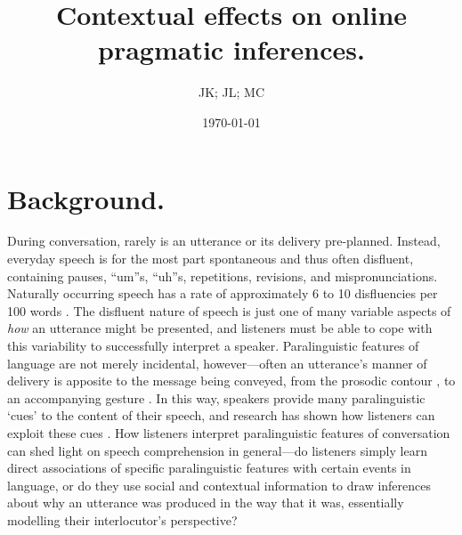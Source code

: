 \documentclass[man]{apa6}
\begin{document}
\title{Contextual effects on online pragmatic inferences.}
\author{JK; JL; MC}
\date{\today}
\maketitle

\section{Background.}
During conversation, rarely is an utterance or its delivery pre-planned.
Instead, everyday speech is for the most part spontaneous and thus often disfluent, containing pauses, ``um''s, ``uh''s, repetitions, revisions, and mispronunciations. 
Naturally occurring speech has a rate of approximately 6 to 10 disfluencies per 100 words \citep{Bortfeld2001, FoxTree1995}.
The disfluent nature of speech is just one of many variable aspects of \textit{how} an utterance might be presented, and listeners must be able to cope with this variability to successfully interpret a speaker.
Paralinguistic features of language are not merely incidental, however---often an utterance's manner of delivery is apposite to the message being conveyed, from the prosodic contour \citep{Fernald1991}, to an accompanying gesture \citep{Alibali2001}. 
In this way, speakers provide many paralinguistic `cues' to the content of their speech, and research has shown how listeners can exploit these cues \citep{Corley2007, Barr2001, Hostetter2011, Frazier2006}. 
How listeners interpret paralinguistic features of conversation can shed light on speech comprehension in general---do listeners simply learn direct associations of specific paralinguistic features with certain events in language, or do they use social and contextual information to draw inferences about why an utterance was produced in the way that it was, essentially modelling their interlocutor's perspective?\\
\end{document}
